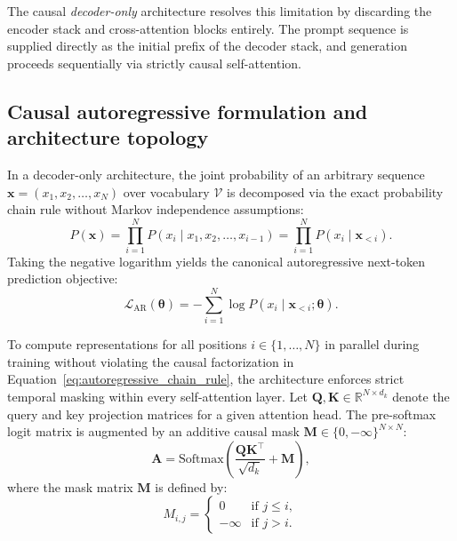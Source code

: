 \documentclass[../../main.tex]{subfiles}
\begin{document}
The causal \emph{decoder-only} architecture resolves this limitation by discarding the encoder stack and cross-attention blocks entirely. The prompt sequence is supplied directly as the initial prefix of the decoder stack, and generation proceeds sequentially via strictly causal self-attention.


\subsection{Causal autoregressive formulation and architecture topology}
\label{subsec:causal_autoregression_topology}

In a decoder-only architecture, the joint probability of an arbitrary sequence $\mathbf{x} = (x_1, x_2, \dots, x_N)$ over vocabulary $\mathcal{V}$ is decomposed via the exact probability chain rule without Markov independence assumptions:
\begin{equation}
P(\mathbf{x}) = \prod_{i=1}^N P(x_i \mid x_1, x_2, \dots, x_{i-1}) = \prod_{i=1}^N P(x_i \mid \mathbf{x}_{<i}).
\label{eq:autoregressive_chain_rule}
\end{equation}
Taking the negative logarithm yields the canonical autoregressive next-token prediction objective:
\begin{equation}
\mathcal{L}_{\text{AR}}(\boldsymbol{\theta}) = -\sum_{i=1}^N \log P(x_i \mid \mathbf{x}_{<i}; \boldsymbol{\theta}).
\label{eq:clm_objective_formal}
\end{equation}

To compute representations for all positions $i \in \{1, \dots, N\}$ in parallel during training without violating the causal factorization in Equation~\eqref{eq:autoregressive_chain_rule}, the architecture enforces strict temporal masking within every self-attention layer. Let $\mathbf{Q}, \mathbf{K} \in \mathbb{R}^{N \times d_k}$ denote the query and key projection matrices for a given attention head. The pre-softmax logit matrix is augmented by an additive causal mask $\mathbf{M} \in \{0, -\infty\}^{N \times N}$:
\begin{equation}
\mathbf{A} = \text{Softmax}\left(\frac{\mathbf{Q}\mathbf{K}^\top}{\sqrt{d_k}} + \mathbf{M}\right),
\label{eq:causal_masked_attention}
\end{equation}
where the mask matrix $\mathbf{M}$ is defined by:
\begin{equation}
M_{i,j} = \begin{cases}
0 & \text{if } j \le i, \\
-\infty & \text{if } j > i.
\end{cases}
\label{eq:causal_mask_matrix}
\end{equation}
\end{document}
